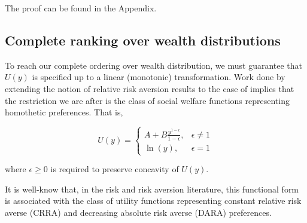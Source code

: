 \documentclass[\econtexRoot/IneqMeas]{subfiles}
\begin{document}
\par The proof can be found in the Appendix.

\subsection{Complete ranking over wealth distributions}

\par To reach our complete ordering over wealth distribution, we must guarantee that $U(y)$ is specified up to a linear (monotonic) transformation. Work done by \cite{rklm81} extending the notion of relative risk aversion results to the case of  implies that the restriction we are after is the class of social welfare functions representing homothetic preferences. That is,

\begin{equation}
U(y) = 
	\begin{cases}
	A + B \frac{y^{1-\epsilon}}{1-\epsilon}, & \epsilon \neq 1\\
	\ln(y), & \epsilon =1
	\end{cases}
\end{equation}

\par where $\epsilon \geq 0$ is required to preserve concavity of $U(y)$. 

\par It is well-know that, in the risk and risk aversion literature, this functional form is associated with the class of utility functions representing constant relative risk averse (CRRA) and decreasing absolute risk averse (DARA) preferences.



\onlyinsubfile{}

\end{document}
